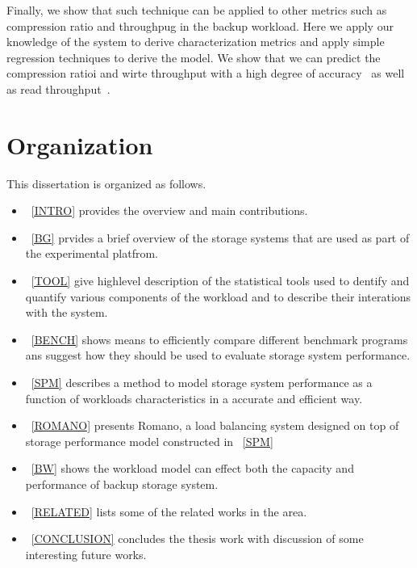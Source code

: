 Finally, we show that such technique can be applied to other metrics such as compression ratio and throughpug in the backup workload. 
Here we apply our knowledge of the system to derive characterization metrics and apply simple regression techniques to derive the model.
We show that we can predict the compression ratioi and wirte throughput with a high degree of accuracy~\cite{park:2010} as well as read throughput~\cite{nam:2011}.

\section{Organization}
This dissertation is organized as follows.

\begin{itemize}

\item \CHP~\ref{INTRO} provides the overview and main contributions.

\item \CHP~\ref{BG} prvides a brief overview of the storage systems that are used as part of the experimental platfrom.

\item \CHP~\ref{TOOL} give highlevel description of the statistical tools used to dentify and quantify various components of the workload and to describe their interations with the system. 

\item \CHP~\ref{BENCH} shows means to efficiently compare different benchmark programs ans suggest how they should be used to evaluate storage system performance. 

\item \CHP~\ref{SPM} describes a method to model storage system performance as a function of workloads characteristics in a accurate and efficient way.

\item \CHP~\ref{ROMANO} presents Romano, a load balancing system designed on top of storage performance model constructed in \CHP~\ref{SPM}

\item \CHP~\ref{BW} shows the workload model can effect both the capacity and performance of backup storage system. 

\item \CHP~\ref{RELATED} lists some of the related works in the area.

\item \CHP~\ref{CONCLUSION} concludes the thesis work with discussion of some interesting future works. 
 
\end{itemize}
